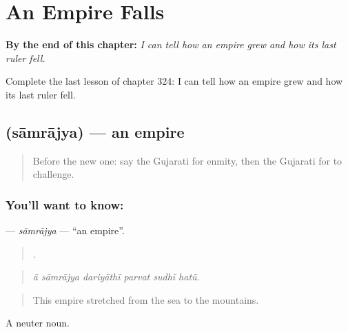 
\chapter{An Empire Falls}
\label{ch:gu-an-empire-falls}

\begin{chapteropening}
\textbf{By the end of this chapter:} \emph{I can tell how an empire grew and how its last ruler fell.}

Complete the last lesson of chapter 324: I can tell how an empire grew and how its last ruler fell.
\end{chapteropening}

\section[\texorpdfstring{\gu{સામ્રાજ્ય} (sāmrājya)}{સામ્રાજ્ય (sāmrājya)}]{ (sāmrājya) — an empire}

\label{lesson:GU-C324-samrajya}



\begin{quote}
Before the new one: say the Gujarati for enmity, then the Gujarati for to challenge.
\end{quote}

\subsection*{You'll want to know: }
\textbf{} — \emph{sāmrājya} — \textquotedblleft{}an empire\textquotedblright{}.

\begin{quote}
     .
\end{quote}

\begin{quote}
\emph{ā sāmrājya dariyāthī parvat sudhī hatũ.}
\end{quote}

\begin{quote}
This empire stretched from the sea to the mountains.
\end{quote}

A neuter noun.

